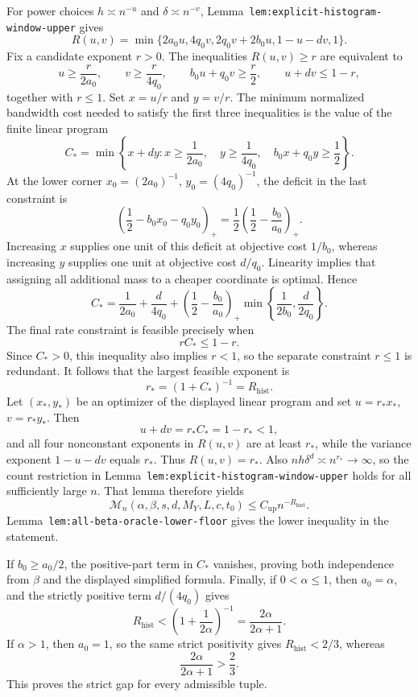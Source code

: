 For power choices \(h\asymp n^{-u}\) and \(\delta\asymp n^{-v}\), Lemma~\texttt{lem:explicit-histogram-window-upper} gives
\[
R(u,v)=\min\{2a_0u,4q_0v,2q_0v+2b_0u,1-u-dv,1\}.
\]
Fix a candidate exponent \(r>0\). The inequalities \(R(u,v)\ge r\) are equivalent to
\[
u\ge\frac r{2a_0},\qquad
v\ge\frac r{4q_0},\qquad
b_0u+q_0v\ge\frac r2,
\qquad
u+dv\le1-r,
\]
together with \(r\le1\). Set \(x=u/r\) and \(y=v/r\). The minimum normalized bandwidth cost needed to satisfy the first three inequalities is the value of the finite linear program
\[
C_*=\min\left\{x+dy:
 x\ge\frac1{2a_0},\quad
 y\ge\frac1{4q_0},\quad
 b_0x+q_0y\ge\frac12
\right\}.
\]
At the lower corner \(x_0=(2a_0)^{-1}\), \(y_0=(4q_0)^{-1}\), the deficit in the last constraint is
\[
\left(\frac12-b_0x_0-q_0y_0\right)_+
=
\frac12\left(\frac12-\frac{b_0}{a_0}\right)_+.
\]
Increasing \(x\) supplies one unit of this deficit at objective cost \(1/b_0\), whereas increasing \(y\) supplies one unit at objective cost \(d/q_0\). Linearity implies that assigning all additional mass to a cheaper coordinate is optimal. Hence
\[
C_*=\frac1{2a_0}+\frac d{4q_0}
+\left(\frac12-\frac{b_0}{a_0}\right)_+
\min\left\{\frac1{2b_0},\frac d{2q_0}\right\}.
\]
The final rate constraint is feasible precisely when
\[
rC_*\le1-r.
\]
Since \(C_*>0\), this inequality also implies \(r<1\), so the separate constraint \(r\le1\) is redundant. It follows that the largest feasible exponent is
\[
r_*=(1+C_*)^{-1}=R_{\mathrm{hist}}.
\]
Let \((x_*,y_*)\) be an optimizer of the displayed linear program and set \(u=r_*x_*\), \(v=r_*y_*\). Then
\[
u+dv=r_*C_*=1-r_*<1,
\]
and all four nonconstant exponents in \(R(u,v)\) are at least \(r_*\), while the variance exponent \(1-u-dv\) equals \(r_*\). Thus \(R(u,v)=r_*\). Also \(nh\delta^d\asymp n^{r_*}\to\infty\), so the count restriction in Lemma~\texttt{lem:explicit-histogram-window-upper} holds for all sufficiently large \(n\). That lemma therefore yields
\[
\mathcal M_n(\alpha,\beta,s,d,M_Y,L,c,t_0)
\le C_{\mathrm{up}}n^{-R_{\mathrm{hist}}}.
\]
Lemma~\texttt{lem:all-beta-oracle-lower-floor} gives the lower inequality in the statement.

If \(b_0\ge a_0/2\), the positive-part term in \(C_*\) vanishes, proving both independence from \(\beta\) and the displayed simplified formula. Finally, if \(0<\alpha\le1\), then \(a_0=\alpha\), and the strictly positive term \(d/(4q_0)\) gives
\[
R_{\mathrm{hist}}
<
\left(1+\frac1{2\alpha}\right)^{-1}
=
\frac{2\alpha}{2\alpha+1}.
\]
If \(\alpha>1\), then \(a_0=1\), so the same strict positivity gives \(R_{\mathrm{hist}}<2/3\), whereas
\[
\frac{2\alpha}{2\alpha+1}>\frac23.
\]
This proves the strict gap for every admissible tuple.
